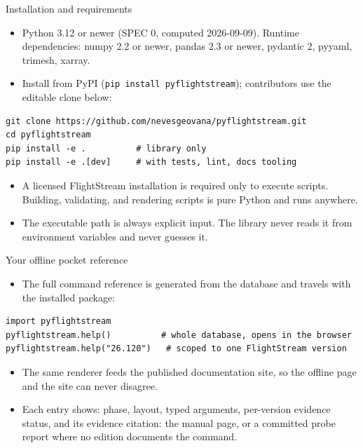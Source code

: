 \documentclass[aspectratio=169,10pt]{beamer}
\newcommand{\code}[1]{\texttt{\small #1}}
\begin{document}
\begin{frame}[fragile]{Installation and requirements}
  \begin{itemize}
    \item Python 3.12 or newer (SPEC 0, computed 2026-09-09). Runtime dependencies: numpy 2.2 or newer, pandas 2.3 or newer, pydantic 2, pyyaml, trimesh, xarray.
    \item Install from PyPI (\code{pip install pyflightstream}); contributors use the editable clone below:
  \end{itemize}
\begin{lstlisting}[style=txt]
git clone https://github.com/nevesgeovana/pyflightstream.git
cd pyflightstream
pip install -e .          # library only
pip install -e .[dev]     # with tests, lint, docs tooling
\end{lstlisting}
  \begin{itemize}
    \item A licensed FlightStream installation is required only to execute scripts. Building, validating, and rendering scripts is pure Python and runs anywhere.
    \item The executable path is always explicit input. The library never reads it from environment variables and never guesses it.
  \end{itemize}
\end{frame}

\begin{frame}[fragile]{Your offline pocket reference}
  \begin{itemize}
    \item The full command reference is generated from the database and travels with the installed package:
  \end{itemize}
\begin{lstlisting}
import pyflightstream
pyflightstream.help()          # whole database, opens in the browser
pyflightstream.help("26.120")   # scoped to one FlightStream version
\end{lstlisting}
  \begin{itemize}
    \item The same renderer feeds the published documentation site, so the offline page and the site can never disagree.
    \item Each entry shows: phase, layout, typed arguments, per-version evidence status, and its evidence citation: the manual page, or a committed probe report where no edition documents the command.
  \end{itemize}
\end{frame}
\end{document}
